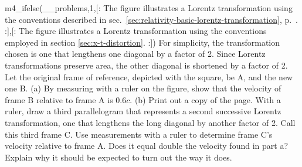 m4_ifelse(__problems,1,[:%
The figure illustrates a Lorentz transformation using the conventions
described in sec.~\ref{sec:relativity-basic-lorentz-transformation},
p.~\pageref{sec:relativity-basic-lorentz-transformation}.
:],[:%
The figure illustrates a Lorentz transformation using the conventions
employed in section \ref{sec:x-t-distortion}.
:])%
For simplicity, the
transformation chosen is one that lengthens one diagonal by a factor
of 2. Since Lorentz transformations preserve area, the other diagonal
is shortened by a factor of 2. Let the original frame of reference,
depicted with the square, be A, and the new one B. 
%
(a) By measuring with a ruler on the figure, show that the velocity of frame B relative to frame A is $0.6c$.
%
(b) Print out a copy of the page. With a ruler, draw a third parallelogram that represents a second successive Lorentz transformation, one
that lengthens the long diagonal by another factor of 2. Call this third frame C. Use measurements with a ruler to determine
frame C's velocity relative to frame A. Does it equal double the velocity found in part a? Explain why it should be expected to turn
out the way it does.\answercheck
